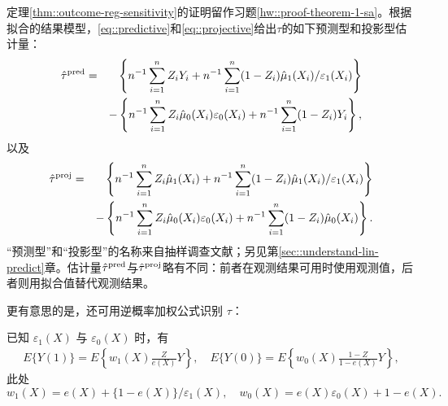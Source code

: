 定理\ref{thm::outcome-reg-sensitivity}的证明留作习题\ref{hw::proof-theorem-1-sa}。根据拟合的结果模型，\eqref{eq::predictive}和\eqref{eq::projective}给出$\tau$的如下预测型和投影型估计量：
\begin{eqnarray*}
\hat\tau^{\textup{pred}} &=&\left\{  n^{-1}\sum_{i=1}^n Z_i Y_i + n^{-1} \sum_{i=1}^n (1-Z_i) \hat{\mu}_1(X_i)   / \varepsilon_1(X_i)  \right\} \\
&&- \left\{ n^{-1}  \sum_{i=1}^n Z_i \hat{\mu}_0(X_i)    \varepsilon_0(X_i) + n^{-1} \sum_{i=1}^n (1-Z_i) Y_i \right\},
\end{eqnarray*}
以及
\begin{eqnarray*}
\hat{\tau}^{\textup{proj}}&=&\left\{ n^{-1}\sum_{i=1}^n Z_{i}\hat{\mu}_{1}(X_{i})+n^{-1}\sum_{i=1}^n(1-Z_{i})\hat{\mu}_{1}(X_{i})/\varepsilon_{1}(X_{i})\right\} \\
&&-\left\{ n^{-1}\sum_{i=1}^n Z_{i}\hat{\mu}_{0}(X_{i})\varepsilon_{0}(X_{i})+n^{-1}\sum_{i=1}^n(1-Z_{i})\hat{\mu}_{0}(X_{i})\right\}.
\end{eqnarray*}
“预测型”和“投影型”的名称来自抽样调查文献\citep{firth1998robust, ding2018causal}；另见第\ref{sec::understand-lin-predict}章。估计量$\hat\tau^{\textup{pred}} $与$\hat{\tau}^{\textup{proj}}$略有不同：前者在观测结果可用时使用观测值，后者则用拟合值替代观测结果。 





更有意思的是，还可用逆概率加权公式识别 $\tau$：

\begin{theorem}\label{thm::ipw-sensitivity}
已知 $\varepsilon_1(X)$ 与 $ \varepsilon_0(X) $ 时，有
\begin{eqnarray*} 
E\{ Y(1) \} = 
E\left\{ w_1(X) \frac{Z}{e(X)}  Y  \right\}  ,\quad
 E\{Y(0)\} = E\left\{ w_0(X) \frac{1-Z}{1-e(X)} Y \right\},
\end{eqnarray*}
此处
$$
w_1(X) = e(X) + \{1-e(X)\}/ \varepsilon_1(X) ,\quad
w_0(X) = e(X)  \varepsilon_0(X) + 1- e(X). 
$$
\end{theorem}


 
 


